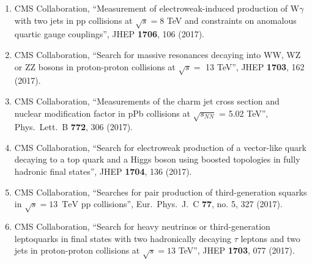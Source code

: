 \begin{enumerate}
\item CMS Collaboration, ``Measurement of electroweak-induced production of W$\gamma$ with two jets in pp collisions at $ \sqrt{s}=8 $ TeV and constraints on anomalous quartic gauge couplings'', JHEP {\bf 1706}, 106 (2017).

\item CMS Collaboration, ``Search for massive resonances decaying into WW, WZ or ZZ bosons in proton-proton collisions at $\sqrt{s} = $ 13 TeV'', JHEP {\bf 1703}, 162 (2017).

\item CMS Collaboration, ``Measurements of the charm jet cross section and nuclear modification factor in pPb collisions at $\sqrt{{s}_{NN}}$ = 5.02 TeV'', Phys.\ Lett.\ B {\bf 772}, 306 (2017).

\item CMS Collaboration, ``Search for electroweak production of a vector-like quark decaying to a top quark and a Higgs boson using boosted topologies in fully hadronic final states'', JHEP {\bf 1704}, 136 (2017).

\item CMS Collaboration, ``Searches for pair production of third-generation squarks in $\sqrt{s}=13$ $\,\text {TeV}$ pp collisions'', Eur.\ Phys.\ J.\ C {\bf 77}, no. 5, 327 (2017).

\item CMS Collaboration, ``Search for heavy neutrinos or third-generation leptoquarks in final states with two hadronically decaying $\tau$ leptons and two jets in proton-proton collisions at $ \sqrt{s}=13 $ TeV'', JHEP {\bf 1703}, 077 (2017).


\end{enumerate}
